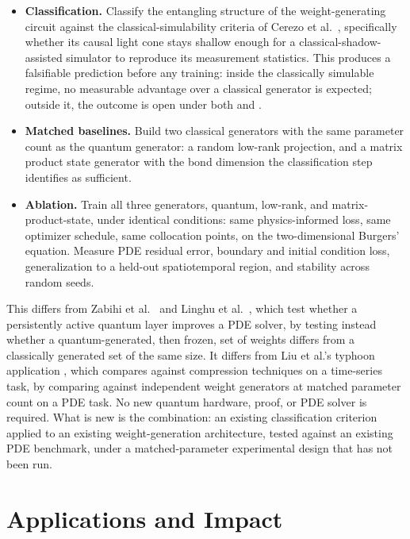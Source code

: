 \documentclass[10pt,a4paper]{article}
\begin{document}
\begin{itemize}
\item \textbf{Classification.} Classify the entangling structure of the weight-generating circuit against the classical-simulability criteria of Cerezo et al.\ \cite{cerezo2025}, specifically whether its causal light cone stays shallow enough for a classical-shadow-assisted simulator to reproduce its measurement statistics. This produces a falsifiable prediction before any training: inside the classically simulable regime, no measurable advantage over a classical generator is expected; outside it, the outcome is open under both \cite{liu2024} and \cite{cerezo2025}.
\item \textbf{Matched baselines.} Build two classical generators with the same parameter count as the quantum generator: a random low-rank projection, and a matrix product state generator with the bond dimension the classification step identifies as sufficient.
\item \textbf{Ablation.} Train all three generators, quantum, low-rank, and matrix-product-state, under identical conditions: same physics-informed loss, same optimizer schedule, same collocation points, on the two-dimensional Burgers' equation. Measure PDE residual error, boundary and initial condition loss, generalization to a held-out spatiotemporal region, and stability across random seeds.
\end{itemize}

This differs from Zabihi et al.\ \cite{zabihi2026} and Linghu et al.\ \cite{linghu2026}, which test whether a persistently active quantum layer improves a PDE solver, by testing instead whether a quantum-generated, then frozen, set of weights differs from a classically generated set of the same size. It differs from Liu et al.'s typhoon application \cite{liu2025typhoon}, which compares against compression techniques on a time-series task, by comparing against independent weight generators at matched parameter count on a PDE task. No new quantum hardware, proof, or PDE solver is required. What is new is the combination: an existing classification criterion applied to an existing weight-generation architecture, tested against an existing PDE benchmark, under a matched-parameter experimental design that has not been run.

\section{Applications and Impact}
\end{document}
